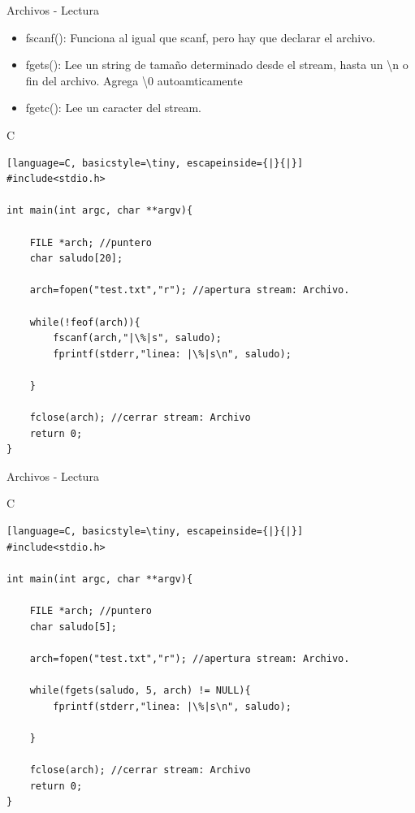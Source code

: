 \documentclass{beamer}
\begin{document}
\begin{frame}[fragile]{Archivos - Lectura}
\begin{itemize}
	\item fscanf(): Funciona al igual que scanf, pero hay que declarar el archivo.
	\item fgets(): Lee un string de tamaño determinado desde el stream, hasta un \textbackslash n o fin del archivo. Agrega \textbackslash 0 autoamticamente
	\item fgetc(): Lee un caracter del stream.
	\end{itemize}
\begin{exampleblock}{C}
\begin{lstlisting}[language=C, basicstyle=\tiny, escapeinside={|}{|}]
#include<stdio.h>

int main(int argc, char **argv){

	FILE *arch; //puntero
	char saludo[20];

	arch=fopen("test.txt","r"); //apertura stream: Archivo.

	while(!feof(arch)){
		fscanf(arch,"|\%|s", saludo);
		fprintf(stderr,"linea: |\%|s\n", saludo);

	}

	fclose(arch); //cerrar stream: Archivo
	return 0;
}
\end{lstlisting}
\end{exampleblock}
\end{frame}

\begin{frame}[fragile]{Archivos - Lectura}
\begin{exampleblock}{C}
\begin{lstlisting}[language=C, basicstyle=\tiny, escapeinside={|}{|}]
#include<stdio.h>

int main(int argc, char **argv){

	FILE *arch; //puntero
	char saludo[5];

	arch=fopen("test.txt","r"); //apertura stream: Archivo.

	while(fgets(saludo, 5, arch) != NULL){
		fprintf(stderr,"linea: |\%|s\n", saludo);

	}

	fclose(arch); //cerrar stream: Archivo
	return 0;
}
\end{lstlisting}
\end{exampleblock}
\end{frame}
\end{document}

